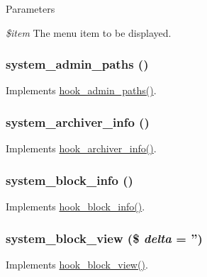 \begin{DoxyParams}{Parameters}
\item[{\em \$item}]The menu item to be displayed. \end{DoxyParams}
\hypertarget{system_8module_a541e64401df167df2dc2b0964f90d9ce}{
\subsubsection[{system\_\-admin\_\-paths}]{\setlength{\rightskip}{0pt plus 5cm}system\_\-admin\_\-paths ()}}
\label{system_8module_a541e64401df167df2dc2b0964f90d9ce}
Implements \hyperlink{group__hooks_ga3fe6d93afc8bb04afbd9e3c326d1bdc1}{hook\_\-admin\_\-paths()}. \hypertarget{system_8module_a39d36c996e2c4ce278f4adaee74ea96c}{
\subsubsection[{system\_\-archiver\_\-info}]{\setlength{\rightskip}{0pt plus 5cm}system\_\-archiver\_\-info ()}}
\label{system_8module_a39d36c996e2c4ce278f4adaee74ea96c}
Implements \hyperlink{group__hooks_ga1c5bd8d11e7d54242528f85434e5b260}{hook\_\-archiver\_\-info()}. \hypertarget{system_8module_a28046ddc2ca1921e14019e2f3cc9175c}{
\subsubsection[{system\_\-block\_\-info}]{\setlength{\rightskip}{0pt plus 5cm}system\_\-block\_\-info ()}}
\label{system_8module_a28046ddc2ca1921e14019e2f3cc9175c}
Implements \hyperlink{group__hooks_ga2bd926c3e90deeba0c3ba64fb3c64d73}{hook\_\-block\_\-info()}. \hypertarget{system_8module_a6afe2fa1e31a2aef9594ff49018634d8}{
\subsubsection[{system\_\-block\_\-view}]{\setlength{\rightskip}{0pt plus 5cm}system\_\-block\_\-view (\$ {\em delta} = {\ttfamily ''})}}
\label{system_8module_a6afe2fa1e31a2aef9594ff49018634d8}
Implements \hyperlink{group__hooks_gaa14092a3e74cdc57aa295100cfd6860d}{hook\_\-block\_\-view()}.

